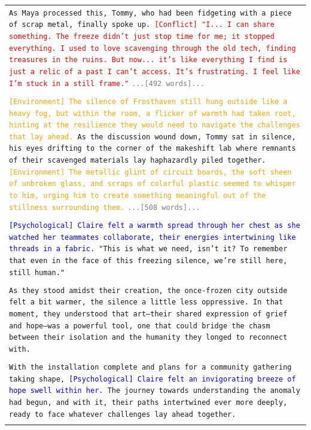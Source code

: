 \documentclass[letterpaper]{article} %
\begin{document}
\begin{small}
\begin{longtable}{p{\textwidth}}
    \texttt{As Maya processed this, Tommy, who had been fidgeting with a piece of scrap metal, finally spoke up. \textcolor{red}{[Conflict] "I... I can share something. The freeze didn't just stop time for me; it stopped everything. I used to love scavenging through the old tech, finding treasures in the ruins. But now... it's like everything I find is just a relic of a past I can't access. It's frustrating. I feel like I'm stuck in a still frame."}}
    \texttt{\textcolor{gray}{...[492 words]...}} \\\\
    
    \texttt{\textcolor{orange}{[Environment] The silence of Frosthaven still hung outside like a heavy fog, but within the room, a flicker of warmth had taken root, hinting at the resilience they would need to navigate the challenges that lay ahead.} As the discussion wound down, Tommy sat in silence, his eyes drifting to the corner of the makeshift lab where remnants of their scavenged materials lay haphazardly piled together. \textcolor{orange}{[Environment] The metallic glint of circuit boards, the soft sheen of unbroken glass, and scraps of colorful plastic seemed to whisper to him, urging him to create something meaningful out of the stillness surrounding them.}}
    \texttt{\textcolor{gray}{...[508 words]...}} \\\\

    \texttt{\textcolor{blue}{[Psychological] Claire felt a warmth spread through her chest as she watched her teammates collaborate, their energies intertwining like threads in a fabric.} "This is what we need, isn't it? To remember that even in the face of this freezing silence, we're still here, still human."} \\\\

    \texttt{As they stood amidst their creation, the once-frozen city outside felt a bit warmer, the silence a little less oppressive. In that moment, they understood that art—their shared expression of grief and hope—was a powerful tool, one that could bridge the chasm between their isolation and the humanity they longed to reconnect with.} \\\\

    \texttt{With the installation complete and plans for a community gathering taking shape, \textcolor{blue}{[Psychological] Claire felt an invigorating breeze of hope swell within her.} The journey towards understanding the anomaly had begun, and with it, their paths intertwined ever more deeply, ready to face whatever challenges lay ahead together.} \\\\


\end{longtable}
\end{small}
\end{document}
